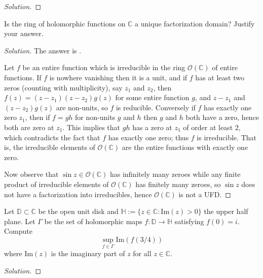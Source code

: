 \documentclass[10pt]{article}
\providecommand{\CC}{\mathbb C}
\newenvironment{soln}{\begin{proof}[Solution]}{\end{proof}}
\begin{document}
\begin{soln}

\end{soln}



\begin{problem}
[2017 J-I-5]
Is the ring of holomorphic functions on $\mathbb{C}$ a unique factorization domain? Justify your answer.
\end{problem}

\begin{soln}
    The answer is .

    Let $f$ be an entire function which is irreducible
    in the ring $\mathcal O(\CC)$ of entire functions.
    If $f$ is nowhere vanishing then it is a unit,
    and if $f$ has at least two zeros (counting with multiplicity),
    say $z_1$ and $z_2$, then $f(z) = (z - z_1)(z - z_2)g(z)$
    for some entire function $g$,
    and $z-z_1$ and $(z-z_2)g(z)$ are non-units,
    so $f$ is reducible.
    Conversely if $f$ has exactly one zero $z_1$,
    then if $f = gh$ for non-units $g$ and $h$
    then $g$ and $h$ both have a zero,
    hence both are zero at $z_1$.
    This implies that $gh$ has a zero at $z_1$
    of order at least $2$, which contradicts the fact that
    $f$ has exactly one zero; thus $f$ is irreducible.
    That is, the irreducible elements of $\mathcal O(\CC)$
    are the entire functions with exactly one zero.

    Now observe that $\sin z\in\mathcal O(\CC)$
    has infinitely many zeroes
    while any finite product of irreducible elements
    of $\mathcal O(\CC)$ has finitely many zeroes,
    so $\sin z$ does not have a factorization into irreducibles,
    hence $\mathcal O(\CC)$ is not a UFD.
\end{soln}



\begin{problem}
[2017 J-II-5]
Let $\mathbb{D} \subset \mathbb{C}$ be the open unit disk and $\mathbb{H}:=\{z \in \mathbb{C}: \text{Im}(z)>0\}$ the upper half plane. Let $\Gamma$ be the set of holomorphic maps $f: \mathbb{D} \longrightarrow \mathbb{H}$ satisfying $f(0)=i.$ Compute
$$
\sup _{f \in \Gamma} \text{Im}(f(3 / 4))
$$
where $\text{Im}(z)$ is the imaginary part of $z$ for all $z \in \mathbb{C}.$
\end{problem}

\begin{soln}

\end{soln}
\end{document}
